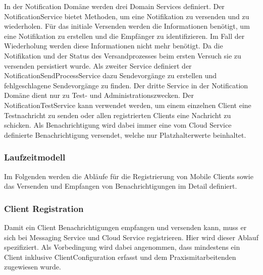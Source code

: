 In der Notification Domäne werden drei Domain Services definiert.
Der NotificationService bietet Methoden, um eine Notifikation zu versenden und zu wiederholen.
Für das initiale Versenden werden die Informationen benötigt, um eine Notifikation zu erstellen und die Empfänger zu identifizieren.
Im Fall der Wiederholung werden diese Informationen nicht mehr benötigt.
Da die Notifikation und der Status des Versandprozesses beim ersten Versuch sie zu versenden persistiert wurde.
Als zweiter Service definiert der NotificationSendProcessService dazu Sendevorgänge zu erstellen und fehlgeschlagene Sendevorgänge zu finden.
Der dritte Service in der Notification Domäne dient nur zu Test- und Administrationszwecken.
Der NotificationTestService kann verwendet werden, um einem einzelnen Client eine Testnachricht zu senden oder allen registrierten Clients eine Nachricht zu schicken.
Als Benachrichtigung wird dabei immer eine vom Cloud Service definierte Benachrichtigung versendet, welche nur Platzhalterwerte beinhaltet.

\subsubsection{Laufzeitmodell}

Im Folgenden werden die Abläufe für die Registrierung von Mobile Clients sowie das Versenden und Empfangen von Benachrichtigungen im Detail definiert.

\subsubsection*{Client Registration}

Damit ein Client Benachrichtigungen empfangen und versenden kann, muss er sich bei Messaging Service und Cloud Service registrieren.
Hier wird dieser Ablauf spezifiziert.
Als Vorbedingung wird dabei angenommen, dass mindestens ein Client inklusive ClientConfiguration erfasst und dem Praxismitarbeitenden zugewiesen wurde.

